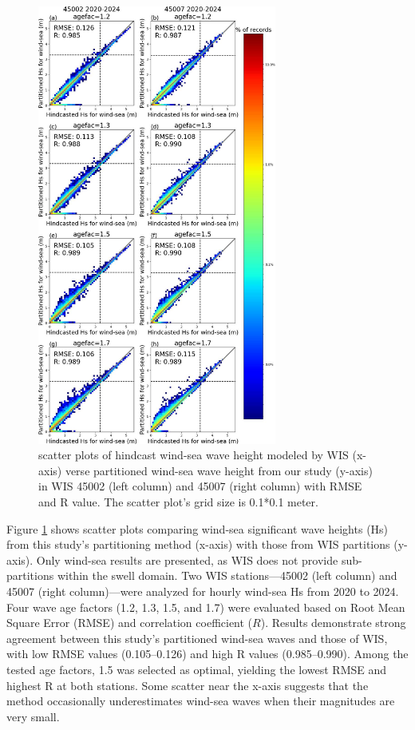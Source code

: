 \begin{figure}[htbp]
  \centering
  \includegraphics[width=0.7\textwidth]{chapter4/resources/figure4-4.jpg}
  \caption{scatter plots of hindcast wind-sea wave height modeled by WIS
  (x-axis) verse partitioned wind-sea wave height from our study (y-axis) in WIS
  45002 (left column) and 45007 (right column) with RMSE and R value. The
  scatter plot’s grid size is 0.1*0.1 meter.}
  \label{fig:fig4.4}
\end{figure}

Figure \ref{fig:fig4.4} shows scatter plots comparing wind-sea significant wave
heights (Hs) from this study’s partitioning method (x-axis) with those from WIS
partitions (y-axis). Only wind-sea results are presented, as WIS does not
provide sub-partitions within the swell domain. Two WIS stations—45002 (left
column) and 45007 (right column)—were analyzed for hourly wind-sea Hs from 2020
to 2024. Four wave age factors (1.2, 1.3, 1.5, and 1.7) were evaluated based on
Root Mean Square Error (RMSE) and correlation coefficient ($R$). Results
demonstrate strong agreement between this study’s partitioned wind-sea waves and
those of WIS, with low RMSE values (0.105–0.126) and high R values
(0.985–0.990). Among the tested age factors, 1.5 was selected as optimal,
yielding the lowest RMSE and highest R at both stations. Some scatter near the
x-axis suggests that the method occasionally underestimates wind-sea waves when
their magnitudes are very small.

